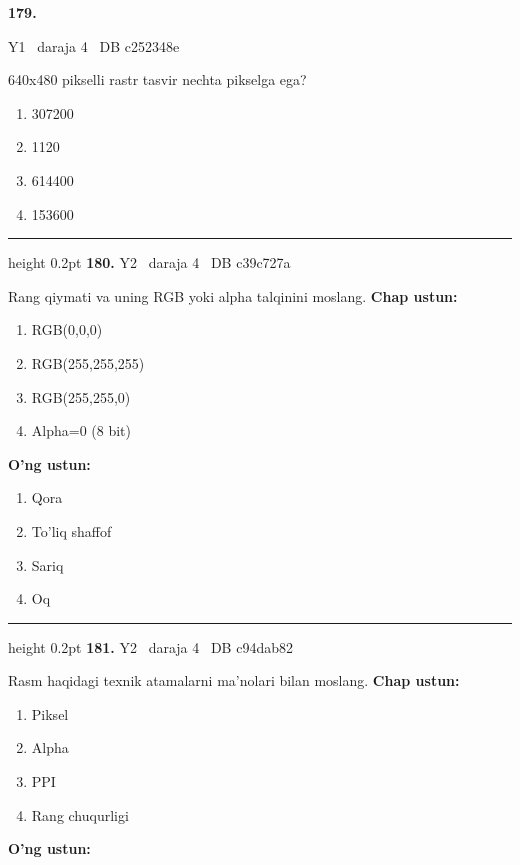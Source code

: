 \documentclass[10pt,a4paper,oneside]{article}
\begin{document}
\hypertarget{q179}{\textbf{\color{ink}179.}}  {\color{muted}\scriptsize Y1 \textbullet\ daraja 4 \textbullet\ DB c252348e}
\par
640x480 pikselli rastr tasvir nechta pikselga ega?
\begin{enumerate}[label=\Alph*),leftmargin=9mm]
\item 307200
\item 1120
\item 614400
\item 153600
\end{enumerate}
\vspace{2mm}\hrule height 0.2pt \vspace{4mm}
\hypertarget{q180}{\textbf{\color{ink}180.}}  {\color{muted}\scriptsize Y2 \textbullet\ daraja 4 \textbullet\ DB c39c727a}
\par
Rang qiymati va uning RGB yoki alpha talqinini moslang.
\textbf{\footnotesize Chap ustun:}
\begin{enumerate}[label=\arabic*),leftmargin=9mm]
\item RGB(0,0,0)
\item RGB(255,255,255)
\item RGB(255,255,0)
\item Alpha=0 (8 bit)
\end{enumerate}
\textbf{\footnotesize O'ng ustun:}
\begin{enumerate}[label=\Alph*),leftmargin=9mm]
\item Qora
\item To'liq shaffof
\item Sariq
\item Oq
\end{enumerate}
\vspace{2mm}\hrule height 0.2pt \vspace{4mm}
\hypertarget{q181}{\textbf{\color{ink}181.}}  {\color{muted}\scriptsize Y2 \textbullet\ daraja 4 \textbullet\ DB c94dab82}
\par
Rasm haqidagi texnik atamalarni ma'nolari bilan moslang.
\textbf{\footnotesize Chap ustun:}
\begin{enumerate}[label=\arabic*),leftmargin=9mm]
\item Piksel
\item Alpha
\item PPI
\item Rang chuqurligi
\end{enumerate}
\textbf{\footnotesize O'ng ustun:}
\end{document}
